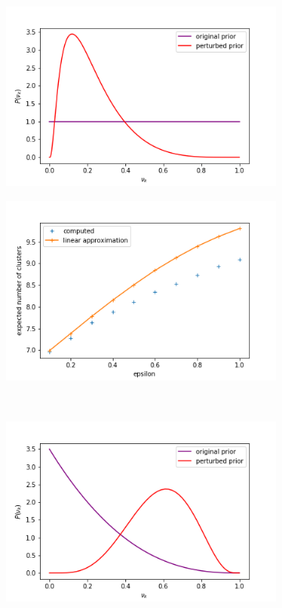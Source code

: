 \documentclass[a4paper]{article}
\begin{document}
\begin{figure}[h!]
	\centering
	\begin{subfigure}[t]{0.32\textwidth}
		\includegraphics[width = \textwidth]{./functional_sens_results/perturbed_prior1_init3_5.png}
		\subcaption{}
	\end{subfigure}
  \begin{subfigure}[t]{0.32\textwidth}
    \includegraphics[width = \textwidth]{./functional_sens_results/pred_num_clusters1_init3_5.png}
    \subcaption{}
  \end{subfigure}\\
  \centering
  \begin{subfigure}[t]{0.32\textwidth}
    \includegraphics[width = \textwidth]{./functional_sens_results/perturbed_prior2_init3_5.png}

\end{subfigure}
\end{figure}
\end{document}
